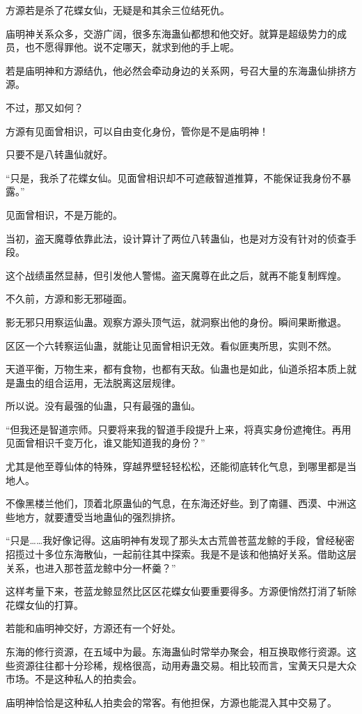 \begin{this_body}
方源若是杀了花蝶女仙，无疑是和其余三位结死仇。

庙明神关系众多，交游广阔，很多东海蛊仙都想和他交好。就算是超级势力的成员，也不愿得罪他。说不定哪天，就求到他的手上呢。

若是庙明神和方源结仇，他必然会牵动身边的关系网，号召大量的东海蛊仙排挤方源。

不过，那又如何？

方源有见面曾相识，可以自由变化身份，管你是不是庙明神！

只要不是八转蛊仙就好。

“只是，我杀了花蝶女仙。见面曾相识却不可遮蔽智道推算，不能保证我身份不暴露。”

见面曾相识，不是万能的。

当初，盗天魔尊依靠此法，设计算计了两位八转蛊仙，也是对方没有针对的侦查手段。

这个战绩虽然显赫，但引发他人警惕。盗天魔尊在此之后，就再不能复制辉煌。

不久前，方源和影无邪碰面。

影无邪只用察运仙蛊。观察方源头顶气运，就洞察出他的身份。瞬间果断撤退。

区区一个六转察运仙蛊，就能让见面曾相识无效。看似匪夷所思，实则不然。

天道平衡，万物生来，都有食物，也都有天敌。仙蛊也是如此，仙道杀招本质上就是蛊虫的组合运用，无法脱离这层规律。

所以说。没有最强的仙蛊，只有最强的蛊仙。

“但我还是智道宗师。只要将来我的智道手段提升上来，将真实身份遮掩住。再用见面曾相识千变万化，谁又能知道我的身份？”

尤其是他至尊仙体的特殊，穿越界壁轻轻松松，还能彻底转化气息，到哪里都是当地人。

不像黑楼兰他们，顶着北原蛊仙的气息，在东海还好些。到了南疆、西漠、中洲这些地方，就要遭受当地蛊仙的强烈排挤。

“只是……我好像记得。这庙明神有发现了那头太古荒兽苍蓝龙鲸的手段，曾经秘密招揽过十多位东海散仙，一起前往其中探索。我是不是该和他搞好关系。借助这层关系，也进入那苍蓝龙鲸中分一杯羹？”

这样考量下来，苍蓝龙鲸显然比区区花蝶女仙要重要得多。方源便悄然打消了斩除花蝶女仙的打算。

若能和庙明神交好，方源还有一个好处。

东海的修行资源，在五域中为最。东海蛊仙时常举办聚会，相互换取修行资源。这些资源往往都十分珍稀，规格很高，动用寿蛊交易。相比较而言，宝黄天只是大众市场。不是这种私人的拍卖会。

庙明神恰恰是这种私人拍卖会的常客。有他担保，方源也能混入其中交易了。


\end{this_body}

